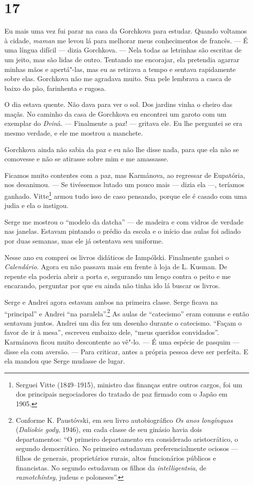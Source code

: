 \section{17}

Eu mais uma vez fui parar na casa da Gorchkova para estudar. Quando
voltamos à cidade, \emph{maman} me levou lá para melhorar meus
conhecimentos de francês. --- É uma língua difícil --- dizia Gorchkova.
--- Nela todas as letrinhas são escritas de um jeito, mas são lidas de
outro. Tentando me encorajar, ela pretendia agarrar minhas mãos e
apertá"-las, mas eu as retirava a tempo e sentava rapidamente sobre elas.
Gorchkova não me agradava muito. Sua pele lembrava a casca de baixo do
pão, farinhenta e rugosa.

O dia estava quente. Não dava para ver o sol. Dos jardins vinha o cheiro
das maçãs. No caminho da casa de Gorchkova eu encontrei um garoto com um
exemplar do \emph{Dvin}á. --- Finalmente a paz! --- gritava ele. Eu lhe
perguntei se era mesmo verdade, e ele me mostrou a manchete.

Gorchkova ainda não sabia da paz e eu não lhe disse nada, para que ela
não se comovesse e não se atirasse sobre mim e me amassasse.

Ficamos muito contentes com a paz, mas Karmánova, ao regressar de
Eupatória, nos desanimou. --- Se tivéssemos lutado um pouco mais ---
dizia ela ---, teríamos ganhado. Vitte\footnote{Serguei Vitte
  (1849--1915), ministro das finanças entre outros cargos, foi um dos
  principais negociadores do tratado de paz firmado com o Japão em 1905.}
armou tudo isso de caso pensando, porque ele é casado com uma judia e
ela o instigou.

Serge me mostrou o ``modelo da datcha'' --- de madeira e com vidros de
verdade nas janelas. Estavam pintando o prédio da escola e o início das
aulas foi adiado por duas semanas, mas ele já ostentava seu uniforme.

Nesse ano eu comprei os livros didáticos de Iampólski. Finalmente ganhei
o \emph{Calendário}. Agora eu não passava mais em frente à loja de L.
Kusman. De repente ela poderia abrir a porta e, segurando um lenço
contra o peito e me encarando, perguntar por que eu ainda não tinha ido
lá buscar os livros.

Serge e Andrei agora estavam ambos na primeira classe. Serge ficava na
``principal'' e Andrei ``na paralela''.\footnote{Conforme K. Paustóvski,
  em seu livro autobiográfico \emph{Os anos longínquos} (\emph{Daliokie
  gody}, 1946), em cada classe de seu ginásio havia dois departamentos:
  ``O primeiro departamento era considerado aristocrático, o segundo
  democrático. No primeiro estudavam preferencialmente ociosos ---
  filhos de generais, proprietários rurais, altos funcionários públicos
  e financistas. No segundo estudavam os filhos da
  \emph{intelligentsia}, de \emph{raznotchíntsy}, judeus e poloneses''.}
As aulas de ``catecismo'' eram comuns e então sentavam juntos. Andrei um
dia fez um desenho durante o catecismo. ``Façam o favor de ir à mesa'',
escreveu embaixo dele, ``meus queridos convidados''. Karmánova ficou
muito descontente ao vê"-lo. --- É uma espécie de pasquim --- disse ela
com aversão. --- Para criticar, antes a própria pessoa deve ser
perfeita. E ela mandou que Serge mudasse de lugar.

